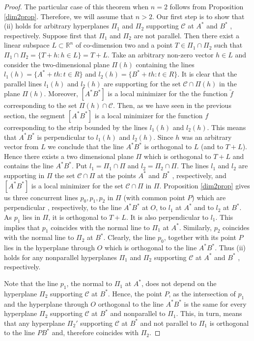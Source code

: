 \documentclass[10pt,a4paper]{amsart}
\begin{document}
\begin{proof}
The particular case of this theorem when $n=2$ follows from
Proposition \ref{dim2prop}. Therefore, we will assume that $n
> 2$. Our first step is to show that  (ii) holds for arbitrary hyperplanes
$\Pi_1$ and $\Pi_2$ supporting $\mathcal C$ at $A^*$ and $B^*$ ,
respectively. Suppose first that $\Pi_1$ and $\Pi_2$ are not
parallel. Then there exist a linear subspace $L \subset
\mathbb{R}^n$ of co-dimension two and a point $T \in \Pi_1 \cap
\Pi_2 $ such that $\Pi_1 \cap \Pi_2 = \{T + h: h \in L\} = T + L$.
Take an arbitrary non-zero vector $h \in L $ and consider the
two-dimensional plane $\Pi(h)$ containing the lines $l_1(h)=\{A^*
+ th: t \in R\}$ and $l_2(h)=\{B^* + th: t \in R\}$. It is clear
that the parallel lines  $l_1(h)$ and $l_2(h)$ are supporting for
the set $\mathcal C \cap \Pi(h)$ in the plane $\Pi(h)$. Moreover,
$[A^*B^*]$ is a local minimizer for the the function $\tilde{f}$ corresponding to the set $\Pi(h) \cap \mathcal
C $. Then, as we have seen in the previous section, the segment $[A^*B^*]$ is a local minimizer for the function $f$ corresponding to the strip bounded by the lines $l_1(h)$ and $l_2(h)$. This means that $A^*B^*$ is perpendicular to  $l_1(h)$ and $l_2(h)$.
Since $h$ was an arbitrary vector from $L$ we
conclude that the line $A^*B^*$ is orthogonal to $L$ (and to
$T+L$).
 Hence there exists a two dimensional plane $\Pi$ which is orthogonal to $T+ L$ and contains the line $A^*B^*$. Put $l_1 = \Pi_1 \cap \Pi$ and $l_2 =\Pi_2 \cap \Pi$.
 The lines $l_1$ and $l_2$ are supporting in $\Pi$ the set $\mathcal C \cap \Pi$ at the points $A^*$ and $B^*$ , respectively, and $[A^*B^*]$ is a local minimizer for the set $\mathcal C \cap \Pi$  in $\Pi$.
 Proposition \ref{dim2prop} gives us three concurrent lines $p_0, p_1, p_2$ in $\Pi$ (with common point $P$)
 which are perpendicular , respectively, to the line $A^*B^*$ at $O$, to $l_1$ at $A^*$ and to $l_2$ at $B^*$.
 As $p_1$ lies in $\Pi$, it is orthogonal to $ T + L$. It is also perpendicular to $l_1$.
This implies that $p_1$ coincides with the normal line to $\Pi_1$ at $A^*$.
 Similarly, $p_2$ coincides with the normal line to $\Pi_2$ at $B^*$. Clearly, the line $p_0$, together with its point $P$ lies in the hyperplane through $O$ which is orthogonal to the line $A^*B^*$.
 Thus (ii)  holds for any nonparallel hyperplanes $\Pi_1$ and $\Pi_2$ supporting $\mathcal C$ at $A^*$ and $B^*$ , respectively.

 \smallskip


 Note that the line $p_1$, the normal to $\Pi_1$ at $A^*$, does not depend on the hyperplane $\Pi_2$ supporting $\mathcal C$ at $B^*$.
 Hence, the point $P$, as the intersection of $p_1$ and the hyperplane through $O$
 orthogonal to the line $A^*B^*$ is the same for every hyperplane $\Pi_2$ supporting $\mathcal C$ at $B^*$ and
 nonparallel to $\Pi_1$. This, in turn, means that any hyperplane $\Pi_2'$ supporting $\mathcal C$ at $B^*$ and
 not parallel to $\Pi_1$ is orthogonal to the line $PB^*$ and, therefore coincides with $\Pi_2$.


\end{proof}
\end{document}
